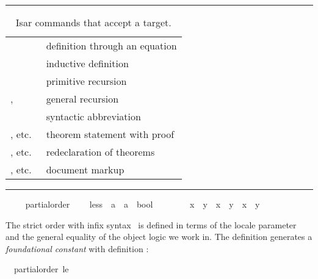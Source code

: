 \begin{isabellebody}
\begin{isamarkuptext}
\begin{table}
\hrule
\vspace{2ex}
\begin{center}
\begin{tabular}{ll}
  \isakeyword{definition} & definition through an equation \\
  \isakeyword{inductive} & inductive definition \\
  \isakeyword{primrec} & primitive recursion \\
  \isakeyword{fun}, \isakeyword{function} & general recursion \\
  \isakeyword{abbreviation} & syntactic abbreviation \\
  \isakeyword{theorem}, etc.\ & theorem statement with proof \\
  \isakeyword{theorems}, etc.\ & redeclaration of theorems \\
  \isakeyword{text}, etc.\ & document markup
\end{tabular}
\end{center}
\hrule
\caption{Isar commands that accept a target.}
\label{tab:commands-with-target}
\end{table}%
\end{isamarkuptext}%
\isamarkuptrue%
\ \ \isamarkupfalse%
\ {\isacharparenleft}\ partial{\isacharunderscore}order{\isacharparenright}\isanewline
\ \ \ \ less\ {\isacharcolon}{\isacharcolon}\ {\isachardoublequoteopen}{\isacharprime}a\ {\isasymRightarrow}\ {\isacharprime}a\ {\isasymRightarrow}\ bool{\isachardoublequoteclose}\ {\isacharparenleft}\ {\isachardoublequoteopen}{\isasymsqsubset}{\isachardoublequoteclose}\ {}{}{\isacharparenright}\isanewline
\ \ \ \ \ {\isachardoublequoteopen}{\isacharparenleft}x\ {\isasymsqsubset}\ y{\isacharparenright}\ {\isacharequal}\ {\isacharparenleft}x\ {\isasymsqsubseteq}\ y\ {\isasymand}\ x\ {\isasymnoteq}\ y{\isacharparenright}{\isachardoublequoteclose}%
\begin{isamarkuptext}%
The strict order  with infix
  syntax~\isa{{\isasymsqsubset}} is
  defined in terms of the locale parameter~ and the general
  equality of the object logic we work in.  The definition generates a
  \emph{foundational constant}
   with definition :
  \begin{isabelle}%
\ \ partial{\isacharunderscore}order\ {\isacharquery}le\ {\isasymLongrightarrow}\isanewline

\end{isabelle}
\end{isamarkuptext}
\end{isabellebody}
